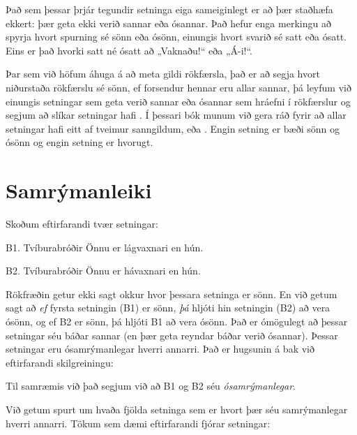 Það sem þessar þrjár tegundir setninga eiga sameiginlegt er að þær staðhæfa ekkert: þær geta ekki verið sannar eða ósannar. Það hefur enga merkingu að spyrja hvort spurning sé sönn eða ósönn, einungis hvort svarið sé satt eða ósatt. Eins er það hvorki satt né ósatt að „Vaknaðu!“ eða „Á-i!“.

Þar sem við höfum áhuga á að meta gildi rökfærsla, það er að segja hvort niðurstaða rökfærslu sé sönn, ef forsendur hennar eru allar sannar, þá leyfum við einungis setningar sem geta verið sannar eða ósannar sem hráefni í rökfærslur og segjum að slíkar setningar hafi . Í þessari bók munum við gera ráð fyrir að allar setningar hafi eitt af tveimur sanngildum,  eða . Engin setning er bæði sönn og ósönn og engin setning er hvorugt.


\section{Samrýmanleiki}
Skoðum eftirfarandi tvær setningar:
	\begin{ebullet}
		\item[B1.] Tvíburabróðir Önnu er lágvaxnari en hún.
		\item[B2.] Tvíburabróðir Önnu er hávaxnari en hún.
	\end{ebullet}
	
Rökfræðin getur ekki sagt okkur hvor þessara setninga er sönn. En við getum sagt að \emph{ef} fyrsta setningin (B1) er sönn, \emph{þá} hljóti hin setningin (B2) að vera ósönn, og ef B2 er sönn, þá hljóti B1 að vera ósönn. Það er ómögulegt að þessar setningar séu báðar sannar (en þær geta reyndar báðar verið ósannar). Þessar setningar eru ósamrýmanlegar hverri annarri. Það er hugsunin á bak við eftirfarandi skilgreiningu:

	Til samræmis við það segjum við að B1 og B2 séu \emph{ósamrýmanlegar}.

Við getum spurt um hvaða fjölda setninga sem er hvort þær séu samrýmanlegar hverri annarri. Tökum sem dæmi eftirfarandi fjórar setningar:

